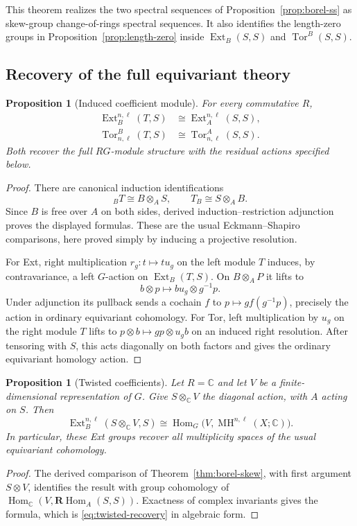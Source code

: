 \documentclass[11pt,a4paper]{article}
\numberwithin{equation}{section}
\newtheorem{proposition}[theorem]{Proposition}
\theoremstyle{definition}
\theoremstyle{remark}
\newcommand{\C}{\mathbb C}
\newcommand{\G}{G}
\newcommand{\MH}{\operatorname{MH}}
\newcommand{\Tor}{\operatorname{Tor}}
\newcommand{\Ext}{\operatorname{Ext}}
\newcommand{\Hom}{\operatorname{Hom}}
\newcommand{\RHom}{\mathbf{R}\!\operatorname{Hom}}
\begin{document}
This theorem realizes the two spectral sequences of
Proposition~\ref{prop:borel-ss} as skew-group change-of-rings spectral
sequences.  It also identifies the length-zero groups in
Proposition~\ref{prop:length-zero} inside $\Ext_B(S,S)$ and
$\Tor^B(S,S)$.

\subsection{Recovery of the full equivariant theory}

\begin{proposition}[Induced coefficient module]\label{prop:mixed}
 For every commutative $R$,
 \begin{align}
 \Ext_B^{n,\ell}(T,S)&\cong\Ext_A^{n,\ell}(S,S),\label{eq:mixed-ext}\\
 \Tor^B_{n,\ell}(T,S)&\cong\Tor^A_{n,\ell}(S,S).
       \label{eq:mixed-tor}
 \end{align}
 Both recover the full $R\G$-module structure with the residual
 actions specified below.
\end{proposition}
\begin{proof}
There are canonical induction identifications
\[
 {}_B T\cong B\otimes_A S,\qquad T_B\cong S\otimes_A B.
\]
Since $B$ is free over $A$ on both sides, derived induction--restriction
adjunction proves the displayed formulas.  These are the usual
Eckmann--Shapiro comparisons, here proved simply by inducing a
projective resolution.

For Ext, right multiplication $r_g:t\mapsto t u_g$ on the left module
$T$ induces, by contravariance, a left $\G$-action on
$\Ext_B(T,S)$.  On $B\otimes_A P$ it lifts to
\[
 b\otimes p\longmapsto b u_g\otimes g^{-1}p.
\]
Under adjunction its pullback sends a cochain $f$ to
$p\mapsto g f(g^{-1}p)$, precisely the action in ordinary equivariant
cohomology.  For Tor, left multiplication by $u_g$ on the right module
$T$ lifts to $p\otimes b\mapsto gp\otimes u_g b$ on an induced
right resolution.  After tensoring with $S$, this acts diagonally on
both factors and gives the ordinary equivariant homology action.
\end{proof}

\begin{proposition}[Twisted coefficients]\label{prop:twisted-skew}
Let $R=\C$ and let $V$ be a finite-dimensional representation of $\G$.
Give $S\otimes_\C V$ the diagonal action, with $A$ acting on $S$.
Then
\[
 \Ext_B^{n,\ell}(S\otimes_\C V,S)
 \cong\Hom_\G\bigl(V,\MH^{n,\ell}(X;\C)\bigr).
\]
In particular, these Ext groups recover all multiplicity spaces of
the usual equivariant cohomology.
\end{proposition}
\begin{proof}
The derived comparison of Theorem~\ref{thm:borel-skew}, with first
argument $S\otimes V$, identifies the result with group cohomology
of $\Hom_\C(V,\RHom_A(S,S))$.  Exactness of complex invariants
gives the formula, which is \eqref{eq:twisted-recovery} in algebraic
form.
\end{proof}
\end{document}
